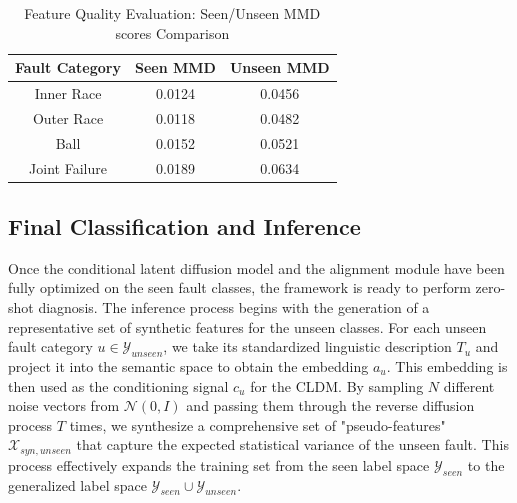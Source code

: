 \begin{table}[htbp]
\caption{Feature Quality Evaluation: Seen/Unseen MMD scores Comparison}
\label{tab:mmd_scores}
\centering
\begin{tabular}{ccc}
\hline
Fault Category & Seen MMD & Unseen MMD \\
\hline
Inner Race & 0.0124 & 0.0456 \\
Outer Race & 0.0118 & 0.0482 \\
Ball & 0.0152 & 0.0521 \\
Joint Failure & 0.0189 & 0.0634 \\
\hline
\end{tabular}
\end{table}

\subsection{Final Classification and Inference}
\label{sec:inference}
Once the conditional latent diffusion model and the alignment module have been fully optimized on the seen fault classes, the framework is ready to perform zero-shot diagnosis. The inference process begins with the generation of a representative set of synthetic features for the unseen classes. For each unseen fault category $u \in \mathcal{Y}_{unseen}$, we take its standardized linguistic description $T_u$ and project it into the semantic space to obtain the embedding $a_u$. This embedding is then used as the conditioning signal $c_u$ for the CLDM. By sampling $N$ different noise vectors from $\mathcal{N}(0, I)$ and passing them through the reverse diffusion process $T$ times, we synthesize a comprehensive set of "pseudo-features" $\mathcal{X}_{syn, unseen}$ that capture the expected statistical variance of the unseen fault. This process effectively expands the training set from the seen label space $\mathcal{Y}_{seen}$ to the generalized label space $\mathcal{Y}_{seen} \cup \mathcal{Y}_{unseen}$.

